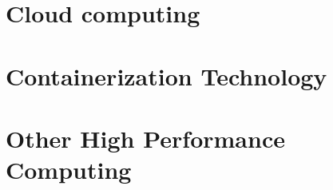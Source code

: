 \section{Cloud computing}

\section{Containerization Technology}

\section{Other High Performance Computing}

